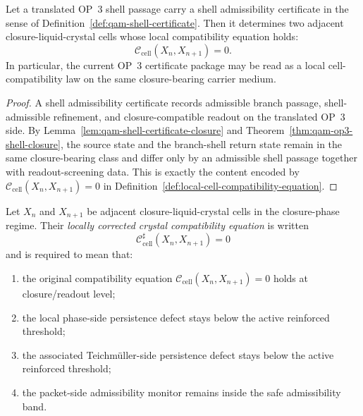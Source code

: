 \begin{proposition}
\label{prop:op3-cell-compatibility-reading}
Let a translated OP~3 shell passage carry a shell admissibility certificate in the sense of Definition~\ref{def:qam-shell-certificate}. Then it determines two adjacent closure-liquid-crystal cells whose local compatibility equation holds:
\[
 \mathcal C_{\mathrm{cell}}(X_n,X_{n+1})=0.
\]
In particular, the current OP~3 certificate package may be read as a local cell-compatibility law on the same closure-bearing carrier medium.
\end{proposition}

\begin{proof}
A shell admissibility certificate records admissible branch passage, shell-admissible refinement, and closure-compatible readout on the translated OP~3 side. By Lemma~\ref{lem:qam-shell-certificate-closure} and Theorem~\ref{thm:qam-op3-shell-closure}, the source state and the branch-shell return state remain in the same closure-bearing class and differ only by an admissible shell passage together with readout-screening data. This is exactly the content encoded by $\mathcal C_{\mathrm{cell}}(X_n,X_{n+1})=0$ in Definition~\ref{def:local-cell-compatibility-equation}.
\end{proof}

\begin{definition}
\label{def:locally-corrected-crystal-compatibility-equation}
Let $X_n$ and $X_{n+1}$ be adjacent closure-liquid-crystal cells in the closure-phase regime. Their \emph{locally corrected crystal compatibility equation} is written
\[
 \mathcal C_{\mathrm{cell}}^{\sharp}(X_n,X_{n+1})=0
\]
and is required to mean that:
\begin{enumerate}[leftmargin=2em,label=(\roman*)]
 \item the original compatibility equation $\mathcal C_{\mathrm{cell}}(X_n,X_{n+1})=0$ holds at closure/readout level;
 \item the local phase-side persistence defect stays below the active reinforced threshold;
 \item the associated Teichmüller-side persistence defect stays below the active reinforced threshold;
 \item the packet-side admissibility monitor remains inside the safe admissibility band.
\end{enumerate}
\end{definition}

